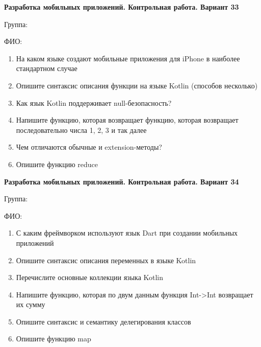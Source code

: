 \documentclass[12pt]{article}
\begin{document}
\newpage\begin{minipage}{\textwidth}
\textbf{Разработка мобильных приложений. Контрольная работа. Вариант 33}

Группа: \underline{\hspace{3cm}}

ФИО: \underline{\hspace{10cm}}

\begin{enumerate}
\item На каком языке создают мобильные приложения для iPhone в наиболее стандартном случае
\item Опишите синтаксис описания функции на языке Kotlin (способов несколько)
\item Как язык Kotlin поддерживает null-безопасность?
\item Напишите функцию, которая возвращает функцию, которая возвращает последовательно числа 1, 2, 3 и так далее
\item Чем отличаются обычные и extension-методы?
\item Опишите функцию reduce

\end{enumerate}
\end{minipage}

\newpage\begin{minipage}{\textwidth}
\textbf{Разработка мобильных приложений. Контрольная работа. Вариант 34}

Группа: \underline{\hspace{3cm}}

ФИО: \underline{\hspace{10cm}}

\begin{enumerate}
\item С каким фреймворком используют язык Dart при создании мобильных приложений
\item Опишите синтаксис описания переменных в языке Kotlin
\item Перечислите основные коллекции языка Kotlin
\item Напишите функцию, которая по двум данным функция Int->Int возвращает их сумму
\item Опишите синтаксис и семантику делегирования классов
\item Опишите функцию map

\end{enumerate}
\end{minipage}
\end{document}
